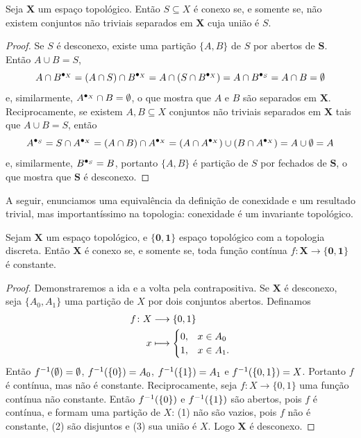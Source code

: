 \begin{proposition}
Seja $\bm X$ um espaço topológico. Então $S \subseteq X$ é conexo se, e somente se, não existem conjuntos não triviais separados em $\bm X$ cuja união é $S$.
\end{proposition}
\begin{proof}
Se $S$ é desconexo, existe uma partição $\{A,B\}$ de $S$ por abertos de $\bm S$. Então $A \cup B=S$,
	\begin{equation*}
	A \cap {B}^{\bullet_{X}} = (A \cap S) \cap {B}^{\bullet_{X}} = A \cap (S \cap {B}^{\bullet_{X}}) = A \cap {B}^{\bullet_{S}} = A \cap B = \emptyset
	\end{equation*}
e, similarmente, ${A}^{\bullet_{X}} \cap B = \emptyset$, o que mostra que $A$ e $B$ são separados em $\bm X$. Reciprocamente, se existem $A,B \subseteq X$ conjuntos não triviais separados em $\bm X$ tais que $A \cup B=S$, então
	\begin{equation*}
	{A}^{\bullet_{S}} = S \cap {A}^{\bullet_{X}} = (A \cap B) \cap {A}^{\bullet_{X}} = (A \cap {A}^{\bullet_{X}}) \cup (B \cap {A}^{\bullet_{X}}) = A \cup \emptyset = A
	\end{equation*}
e, similarmente, ${B}^{\bullet_{S}}=B$, portanto $\{A,B\}$ é partição de $S$ por fechados de $\bm S$, o que mostra que $\bm S$ é desconexo.
\end{proof}

A seguir, enunciamos uma equivalência da definição de conexidade e um resultado trivial, mas importantíssimo na topologia: conexidade é um invariante topológico.

\begin{proposition}
Sejam $\bm X$ um espaço topológico, e $\bm {\{0,1\}}$ espaço topológico com a topologia discreta. Então $\bm X$ é conexo se, e somente se, toda função contínua $f: \bm X \to \bm{\{0,1\}}$ é constante.
\end{proposition}
\begin{proof}
Demonstraremos a ida e a volta pela contrapositiva. Se $\bm X$ é desconexo, seja $\{A_0,A_1\}$ uma partição de $X$ por dois conjuntos abertos. Definamos
	\begin{align*}
	{f}\colon {X} &\longrightarrow {\{0,1\}} \\{x} &\longmapsto 
	\begin{cases}
		0,& x \in A_0 \\
		1,& x \in A_1.
	\end{cases}
	\end{align*}
Então $f^{-1}(\emptyset)=\emptyset$, $f^{-1}(\{0\}) = A_0$, $f^{-1}(\{1\})=A_1$ e $f^{-1}(\{0,1\})=X$. Portanto $f$ é contínua, mas não é constante. Reciprocamente, seja $f: X \to \{0,1\}$ uma função contínua não constante. Então $f^{-1}(\{0\})$ e $f^{-1}(\{1\})$ são abertos, pois $f$ é contínua, e formam uma partição de $X$: (1) não são vazios, pois $f$ não é constante, (2) são disjuntos e (3) sua união é $X$. Logo $\bm X$ é desconexo.
\end{proof}

